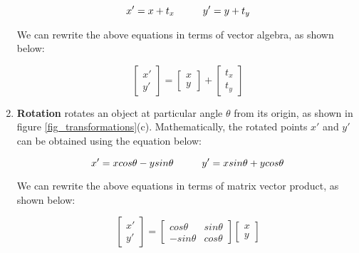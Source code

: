 \documentclass{book}
\begin{document}
\begin{enumerate}
                    \begin{equation} \label{eq_transNaive}
                        x' = x + t_{x} \hspace{10mm} y' = y + t_{y}
                    \end{equation}

                    We can rewrite the above equations in terms of vector algebra, as shown below: 

                    \begin{equation}
                        \begin{bmatrix}
                            x'\\ 
                            y'
                            \end{bmatrix} = 
                            \begin{bmatrix}
                            x\\ 
                            y
                            \end{bmatrix} + \begin{bmatrix}
                            t_{x}\\ 
                            t_{y}
                            \end{bmatrix}
                    \end{equation}
                    \item \textbf{Rotation} rotates an object at particular angle $\theta$ from its origin, as shown in figure \ref{fig_transformations}(c).
                     Mathematically, 
                    the rotated points $x'$ and $y'$ can be obtained using the equation below: 

                    \begin{equation}
                        x' = x cos\theta - ysin\theta \hspace{10mm} y' = xsin\theta + ycos\theta
                    \end{equation}

                    We can rewrite the above equations in terms of matrix vector product, as shown below: 

                    \begin{equation}
                        \begin{bmatrix}
                            x'\\ 
                            y'
                            \end{bmatrix} = \begin{bmatrix}
                            cos\theta & sin\theta\\ 
                            -sin\theta & cos\theta 
                            \end{bmatrix} 
                            \begin{bmatrix}
                            x\\ 
                            y
                            \end{bmatrix}
                    \end{equation}


\end{enumerate}
\end{document}

